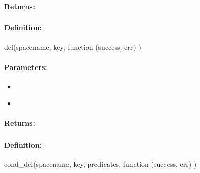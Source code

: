 \paragraph{Returns:}


\pagebreak
\subsubsection{}
\label{api:nodejs:del}


\paragraph{Definition:}
\begin{javascriptcode}
del(spacename, key, function (success, err) {})
\end{javascriptcode}
\paragraph{Parameters:}
\begin{itemize}[noitemsep]
\item {}\\

\item {}\\

\end{itemize}

\paragraph{Returns:}


\pagebreak
\subsubsection{}
\label{api:nodejs:cond_del}


\paragraph{Definition:}
\begin{javascriptcode}
cond_del(spacename, key, predicates, function (success, err) {})
\end{javascriptcode}
